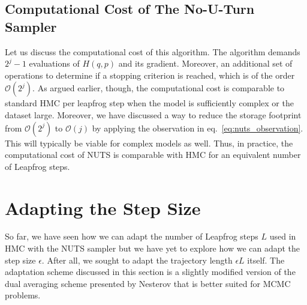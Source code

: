\subsection{Computational Cost of The No-U-Turn Sampler}
Let us discuss the computational cost of this algorithm. The algorithm demands $2^j - 1$ evaluations of $H(q, p)$ and its gradient. Moreover, an additional set of
operations to determine if a stopping criterion is reached, which is of the order $\mathcal{O}(2^j)$. As argued earlier, though, the computational cost is comparable to standard HMC
per leapfrog step
when the model is sufficiently complex or the dataset large.
Moreover, we have discussed a way to reduce the storage footprint from $\mathcal{O}(2^j)$ to $\mathcal{O}(j)$ by applying the observation in eq.~\eqref{eq:nuts_observation}. This will typically be viable for complex models as well. Thus, in practice, the computational cost of NUTS is comparable with HMC for an equivalent number of Leapfrog steps.



\section{Adapting the Step Size}
So far, we have seen how we can adapt the number of Leapfrog steps $L$ used in HMC with the NUTS sampler but we have yet to explore 
how we can adapt the step size $\epsilon$. After all, we sought to adapt the trajectory length $\epsilon L$ itself. The adaptation scheme discussed in this section is a slightly modified version of the dual averaging scheme presented by Nesterov that is better suited for MCMC problems. 

